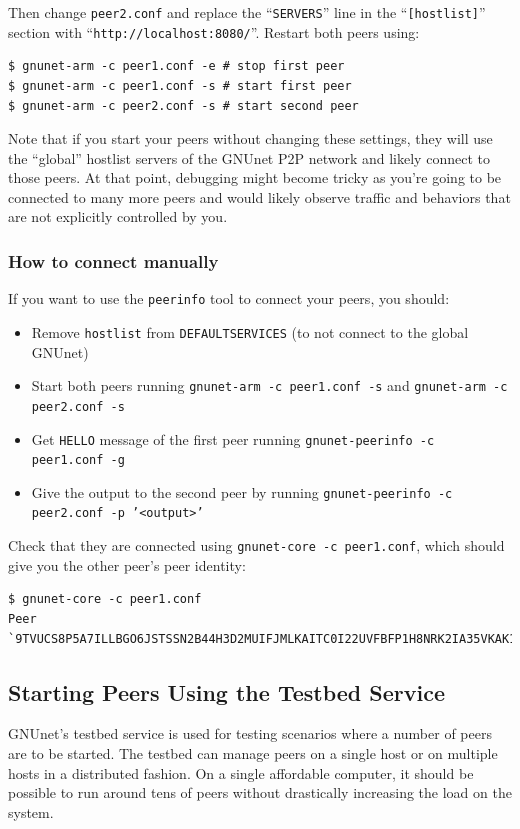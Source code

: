 \documentclass[10pt]{article}
\begin{document}
Then change {\tt peer2.conf} and replace the ``\texttt{SERVERS}'' line in the ``\texttt{[hostlist]}'' section with
``\texttt{http://localhost:8080/}''.  Restart both peers using:
\begin{lstlisting}
$ gnunet-arm -c peer1.conf -e # stop first peer
$ gnunet-arm -c peer1.conf -s # start first peer
$ gnunet-arm -c peer2.conf -s # start second peer
\end{lstlisting}

Note that if you start your peers without changing these settings, they
will use the ``global'' hostlist servers of the GNUnet P2P network and
likely connect to those peers.  At that point, debugging might become
tricky as you're going to be connected to many more peers and would
likely observe traffic and behaviors that are not explicitly controlled
by you.

\subsubsection{How to connect manually}
If you want to use the \texttt{peerinfo} tool to connect your peers, you should:
\begin{itemize}
\itemsep0em
 \item{Remove {\tt hostlist} from {\tt DEFAULTSERVICES} (to not connect to the global GNUnet)}
 \item{Start both peers running {\tt gnunet-arm -c peer1.conf -s} and {\tt gnunet-arm -c peer2.conf -s}}
 \item{Get \texttt{HELLO} message of the first peer running {\tt gnunet-peerinfo -c peer1.conf -g}}
 \item{Give the output to the second peer by running {\tt gnunet-peerinfo -c peer2.conf -p '<output>'}}
\end{itemize}

Check that they are connected using {\tt gnunet-core -c peer1.conf}, which should give you the other peer's
peer identity:
\begin{lstlisting}
$ gnunet-core -c peer1.conf
Peer `9TVUCS8P5A7ILLBGO6JSTSSN2B44H3D2MUIFJMLKAITC0I22UVFBFP1H8NRK2IA35VKAK16LLO0MFS7TAQ9M1KNBJ4NGCHP3JPVULDG'
\end{lstlisting}

\subsection{Starting Peers Using the Testbed Service}

GNUnet's testbed service is used for testing scenarios where a number of peers
are to be started.  The testbed can manage peers on a single host or on multiple
hosts in a distributed fashion.  On a single affordable computer, it should be
possible to run around tens of peers without drastically increasing the load on the
system.
\end{document}
